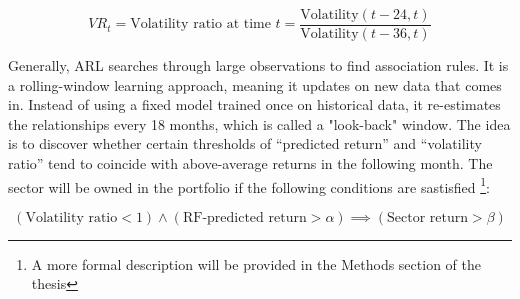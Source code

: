 \begin{equation}
    \label{eq:vol_ratio}
    VR_t = \text{Volatility ratio at time } t = \frac{\text{Volatility}(t-24, t)}{\text{Volatility}(t-36, t)}
\end{equation}
    

Generally, ARL searches through large observations to find association rules. It is a rolling-window learning approach, meaning it updates on new data that comes in. Instead of using a fixed model trained once on historical data, it re-estimates the relationships every 18 months, which is called a "look-back" window.  The idea is to discover whether certain thresholds of “predicted return” and “volatility ratio” tend to coincide with above-average returns in the following month. The sector will be owned in the portfolio if the following conditions are sastisfied \footnote{A more formal description will be provided in the Methods section of the thesis}:

\begin{equation}
    \label{eq:arl}
    (\text{Volatility ratio} < 1) \land (\text{RF-predicted return} > \alpha) \implies (\text{Sector return} > \beta)
\end{equation}
    


